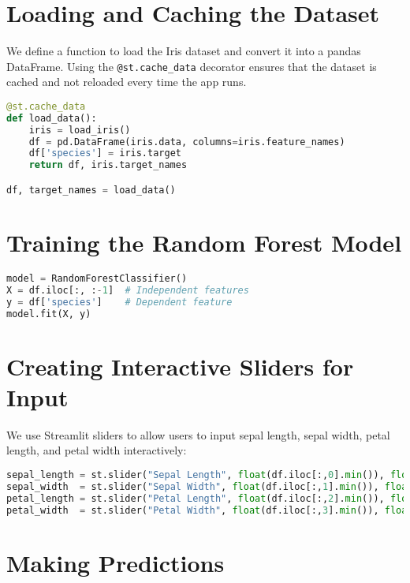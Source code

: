 \section{Loading and Caching the Dataset}

We define a function to load the Iris dataset and convert it into a pandas DataFrame. Using the \texttt{@st.cache\_data} decorator ensures that the dataset is cached and not reloaded every time the app runs.

\begin{lstlisting}[language=Python]
@st.cache_data
def load_data():
    iris = load_iris()
    df = pd.DataFrame(iris.data, columns=iris.feature_names)
    df['species'] = iris.target
    return df, iris.target_names

df, target_names = load_data()
\end{lstlisting}

\section{Training the Random Forest Model}

\begin{lstlisting}[language=Python]
model = RandomForestClassifier()
X = df.iloc[:, :-1]  # Independent features
y = df['species']    # Dependent feature
model.fit(X, y)
\end{lstlisting}

\section{Creating Interactive Sliders for Input}

We use Streamlit sliders to allow users to input sepal length, sepal width, petal length, and petal width interactively:

\begin{lstlisting}[language=Python]
sepal_length = st.slider("Sepal Length", float(df.iloc[:,0].min()), float(df.iloc[:,0].max()))
sepal_width  = st.slider("Sepal Width", float(df.iloc[:,1].min()), float(df.iloc[:,1].max()))
petal_length = st.slider("Petal Length", float(df.iloc[:,2].min()), float(df.iloc[:,2].max()))
petal_width  = st.slider("Petal Width", float(df.iloc[:,3].min()), float(df.iloc[:,3].max()))
\end{lstlisting}

\section{Making Predictions}

